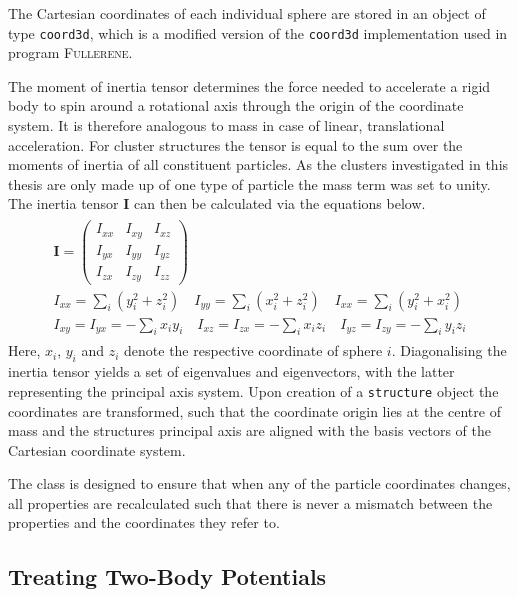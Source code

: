 The Cartesian coordinates of each individual sphere are stored in an object of
type \texttt{coord3d}, which is a modified version of the \verb|coord3d|
implementation used in program
\textsc{Fullerene}.\autocite{Schwerdtfeger_Programfullerenesoftware_2013} 

The moment of inertia tensor determines the force needed to accelerate a rigid
body to spin around a rotational axis through the origin of the coordinate
system. It is therefore analogous to mass in case of linear, translational
acceleration. For cluster structures the tensor is equal to the sum over the
moments of inertia of all constituent particles. As the clusters investigated in
this thesis are only made up of one type of particle the mass term was set to
unity. The inertia tensor $\mathbf{I}$ can then be calculated via the equations
below.
%
\begin{gather}
    \begin{gathered}
    \mathbf{I}=
    \begin{pmatrix}
        I_{xx} & I_{xy} & I_{xz}\\
        I_{yx} & I_{yy} & I_{yz}\\
        I_{zx} & I_{zy} & I_{zz}
    \end{pmatrix}\\
    I_{xx}=\sum_i(y_i^2+z_i^2) \quad I_{yy}=\sum_i(x_i^2+z_i^2) \quad I_{xx}=\sum_i(y_i^2+x_i^2)\\
    I_{xy} = I_{yx} = -\sum_ix_iy_i \quad I_{xz} = I_{zx} = -\sum_ix_iz_i \quad I_{yz} = I_{zy} = -\sum_iy_iz_i
    \end{gathered}
\end{gather}
%
Here, $x_i$, $y_i$ and $z_i$ denote the respective coordinate of sphere $i$.
Diagonalising the inertia tensor yields a set of eigenvalues and eigenvectors,
with the latter representing the principal axis system. Upon creation of a
\verb|structure| object the coordinates are transformed, such that the
coordinate origin lies at the centre of mass and the structures principal axis
are aligned with the basis vectors of the Cartesian coordinate system.

The class is designed to ensure that when any of the particle coordinates
changes, all properties are recalculated such that there is never a mismatch
between the properties and the coordinates they refer to.


\subsection{Treating Two-Body Potentials}
\label{sec:thepairpotentialclass}

